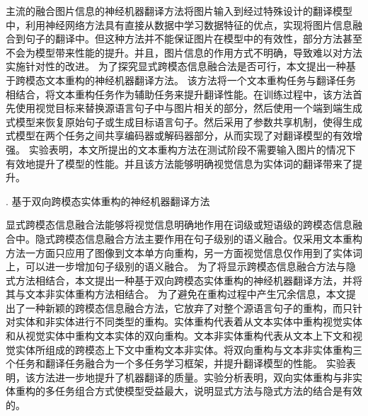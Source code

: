 主流的融合图片信息的神经机器翻译方法将图片输入到经过特殊设计的翻译模型中，利用神经网络方法具有直接从数据中学习数据特征的优点，实现将图片信息融合到句子的翻译中。但这种方法并不能保证图片在模型中的有效性，部分方法甚至不会为模型带来性能的提升。并且，图片信息的作用方式不明确，导致难以对方法实施针对性的改进。
为了探究显式跨模态信息融合法是否可行，本文提出一种基于跨模态文本重构的神经机器翻译方法。
该方法将一个文本重构任务与翻译任务相结合，将文本重构任务作为辅助任务来提升翻译性能。在训练过程中，该方法首先使用视觉目标来替换源语言句子中与图片相关的部分，然后使用一个端到端生成式模型来恢复原始句子或生成目标语言句子。然后采用了参数共享机制，使得生成式模型在两个任务之间共享编码器或解码器部分，从而实现了对翻译模型的有效增强。
实验表明，本文所提出的文本重构方法在测试阶段不需要输入图片的情况下有效地提升了模型的性能。并且该方法能够明确视觉信息为实体词的翻译带来了提升。

{. 基于双向跨模态实体重构的神经机器翻译方法}

显式跨模态信息融合法能够将视觉信息明确地作用在词级或短语级的跨模态信息融合中。隐式跨模态信息融合方法主要作用在句子级别的语义融合。仅采用文本重构方法一方面只应用了图像到文本单方向重构，另一方面视觉信息仅作用到了实体词上，可以进一步增加句子级别的语义融合。
为了将显示跨模态信息融合方法与隐式方法相结合，本文提出一种基于双向跨模态实体重构的神经机器翻译方法，并将其与文本非实体重构方法相结合。
为了避免在重构过程中产生冗余信息，本文提出了一种新颖的跨模态信息融合方法，它放弃了对整个源语言句子的重构，而只针对实体和非实体进行不同类型的重构。实体重构代表着从文本实体中重构视觉实体和从视觉实体中重构文本实体的双向重构。文本非实体重构代表从文本上下文和视觉实体所组成的跨模态上下文中重构文本非实体。将双向重构与文本非实体重构三个任务和翻译任务融合为一个多任务学习框架，并提升翻译模型的性能。
实验表明，该方法进一步地提升了机器翻译的质量。实验分析表明，双向实体重构与非实体重构的多任务组合方式使模型受益最大，说明显式方法与隐式方法的结合是有效的。

